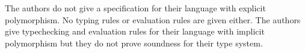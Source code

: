 \documentclass[12pt]{article}	%
\begin{document}
The authors do not give a specification for their language with explicit polymorphism. No typing rules or evaluation rules are given either. The authors give typechecking and evaluation rules for their language with implicit polymorphism but they do not prove soundness for their type system.


%
%
\end{document}
